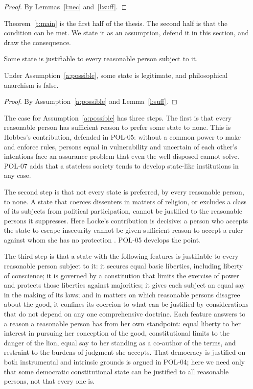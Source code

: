 \documentclass{situationist-preprint}
\begin{document}
\begin{proof}
By Lemmas~\ref{l:nec} and~\ref{l:suff}.
\end{proof}

Theorem~\ref{t:main} is the first half of the thesis. The second half is that the condition can be met. We state it as an assumption, defend it in this section, and draw the consequence.

\begin{assumption}[Possibility]\label{a:possible}
Some state is justifiable to every reasonable person subject to it.
\end{assumption}

\begin{corollary}\label{c:anarchism}
Under Assumption~\ref{a:possible}, some state is legitimate, and philosophical anarchism is false.
\end{corollary}

\begin{proof}
By Assumption~\ref{a:possible} and Lemma~\ref{l:suff}.
\end{proof}

The case for Assumption~\ref{a:possible} has three steps. The first is that every reasonable person has sufficient reason to prefer some state to none. This is Hobbes's contribution, defended in POL-05: without a common power to make and enforce rules, persons equal in vulnerability and uncertain of each other's intentions face an assurance problem that even the well-disposed cannot solve. POL-07 adds that a stateless society tends to develop state-like institutions in any case.

The second step is that not every state is preferred, by every reasonable person, to none. A state that coerces dissenters in matters of religion, or excludes a class of its subjects from political participation, cannot be justified to the reasonable persons it suppresses. Here Locke's contribution is decisive: a person who accepts the state to escape insecurity cannot be given sufficient reason to accept a ruler against whom she has no protection \citep[\S 93]{Locke1689}. POL-05 develops the point.

The third step is that a state with the following features is justifiable to every reasonable person subject to it: it secures equal basic liberties, including liberty of conscience; it is governed by a constitution that limits the exercise of power and protects those liberties against majorities; it gives each subject an equal say in the making of its laws; and in matters on which reasonable persons disagree about the good, it confines its coercion to what can be justified by considerations that do not depend on any one comprehensive doctrine. Each feature answers to a reason a reasonable person has from her own standpoint: equal liberty to her interest in pursuing her conception of the good, constitutional limits to the danger of the lion, equal say to her standing as a co-author of the terms, and restraint to the burdens of judgment she accepts. That democracy is justified on both instrumental and intrinsic grounds is argued in POL-04; here we need only that some democratic constitutional state can be justified to all reasonable persons, not that every one is.
\end{document}
